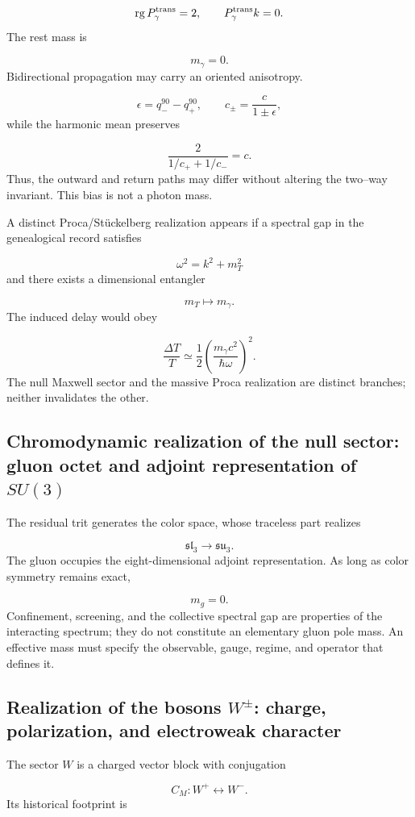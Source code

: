 \[
 \operatorname{rg}P_\gamma^{\rm trans}=2,
\qquad
 P_\gamma^{\rm trans}k=0.
\]
The rest mass is

\[
 m_\gamma=0.
\]
Bidirectional propagation may carry an oriented anisotropy.

\[
 \epsilon=q_-^{90}-q_+^{90},
\qquad
 c_\pm=\frac{c}{1\pm\epsilon},
\]
while the harmonic mean preserves

\[
 \frac{2}{1/c_++1/c_-}=c.
\]
Thus, the outward and return paths may differ without altering the two--way invariant. This bias is not a photon mass.

A distinct Proca/Stückelberg realization appears if a spectral gap in the genealogical record satisfies

\[
 \omega^2=k^2+m_T^2
\]
and there exists a dimensional entangler

\[
 m_T\longmapsto m_\gamma.
\]
The induced delay would obey

\[
 \frac{\Delta T}{T}
 \simeq\frac12
 \left(\frac{m_\gamma c^2}{\hbar\omega}\right)^2.
\]
The null Maxwell sector and the massive Proca realization are distinct branches; neither invalidates the other.

\subsection{Chromodynamic realization of the null sector: gluon octet and adjoint representation of \(SU(3)\)}
The residual trit generates the color space, whose traceless part realizes

\[
 \mathfrak{sl}_3\longrightarrow\mathfrak{su}_3.
\]
The gluon occupies the eight-dimensional adjoint representation. As long as color symmetry remains exact,

\[
 m_g=0.
\]
Confinement, screening, and the collective spectral gap are properties of the interacting spectrum; they do not constitute an elementary gluon pole mass. An effective mass must specify the observable, gauge, regime, and operator that defines it.

\subsection{Realization of the bosons \(W^\pm\): charge, polarization, and electroweak character}
The sector \(W\) is a charged vector block with conjugation

\[
 C_M:W^+\longleftrightarrow W^-.
\]
Its historical footprint is

